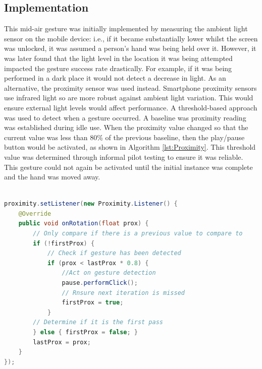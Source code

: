\documentclass{l4proj}
\begin{document}
\subsection{Implementation}
This mid-air gesture was initially implemented by measuring the ambient light sensor on the mobile device: i.e., if it became substantially lower whilst the screen was unlocked, it was assumed a person's hand was being held over it. However, it was later found that the light level in the location it was being attempted impacted the gesture success rate drastically. For example, if it was being performed in a dark place it would not detect a decrease in light. As an alternative, the proximity sensor was used instead. Smartphone proximity sensors use infrared light so are more robust against ambient light variation. This would ensure external light levels would affect performance. A threshold-based approach was used to detect when a gesture occurred. A baseline was proximity reading was established during idle use. When the proximity value changed so that the current value was less than 80\% of the previous baseline, then the play/pause button would be activated, as shown in Algorithm \ref{lst:Proximity}. This threshold value was determined through informal pilot testing to ensure it was reliable. This gesture could not again be activated until the initial instance was complete and the hand was moved away.


\begin{lstlisting}[language=java, float, caption={Java code detailing how the Pause/Play Gesture is detected and how it is acted upon.}, label=lst:Proximity]

proximity.setListener(new Proximity.Listener() {
    @Override
    public void onRotation(float prox) {
        // Only compare if there is a previous value to compare to
        if (!firstProx) {
            // Check if gesture has been detected
            if (prox < lastProx * 0.8) {
                //Act on gesture detection
                pause.performClick();
                // Rnsure next iteration is missed
                firstProx = true;
            }
        // Determine if it is the first pass
        } else { firstProx = false; }
        lastProx = prox;
    }
});
\end{lstlisting}
\end{document}
